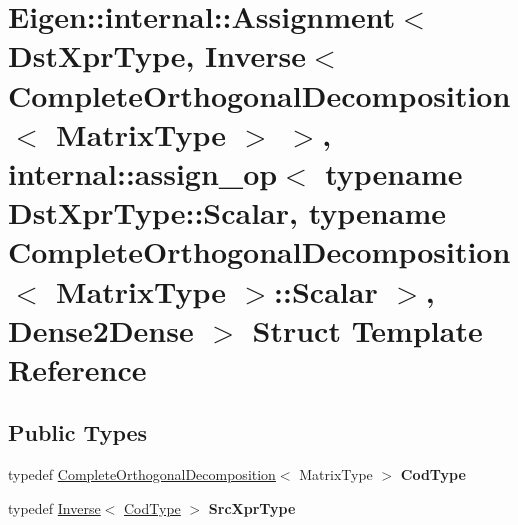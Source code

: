 \hypertarget{struct_eigen_1_1internal_1_1_assignment_3_01_dst_xpr_type_00_01_inverse_3_01_complete_orthogonalcd5d352c5ea4dcae855a0a56ba39cbfd}{}\section{Eigen\+::internal\+::Assignment$<$ Dst\+Xpr\+Type, Inverse$<$ Complete\+Orthogonal\+Decomposition$<$ Matrix\+Type $>$ $>$, internal\+::assign\+\_\+op$<$ typename Dst\+Xpr\+Type\+::Scalar, typename Complete\+Orthogonal\+Decomposition$<$ Matrix\+Type $>$\+::Scalar $>$, Dense2\+Dense $>$ Struct Template Reference}
\label{struct_eigen_1_1internal_1_1_assignment_3_01_dst_xpr_type_00_01_inverse_3_01_complete_orthogonalcd5d352c5ea4dcae855a0a56ba39cbfd}
\subsection*{Public Types}
\begin{DoxyCompactItemize}
\item 
\mbox{\label{struct_eigen_1_1internal_1_1_assignment_3_01_dst_xpr_type_00_01_inverse_3_01_complete_orthogonalcd5d352c5ea4dcae855a0a56ba39cbfd_a6e9ed2f22b3b6819673298563a40a6a0}} 
typedef \mbox{\hyperlink{class_eigen_1_1_complete_orthogonal_decomposition}{Complete\+Orthogonal\+Decomposition}}$<$ Matrix\+Type $>$ {\bfseries Cod\+Type}
\item 
\mbox{\label{struct_eigen_1_1internal_1_1_assignment_3_01_dst_xpr_type_00_01_inverse_3_01_complete_orthogonalcd5d352c5ea4dcae855a0a56ba39cbfd_a3b7796a3ddf3763ff8eaf5d32435a247}} 
typedef \mbox{\hyperlink{class_eigen_1_1_inverse}{Inverse}}$<$ \mbox{\hyperlink{class_eigen_1_1_complete_orthogonal_decomposition}{Cod\+Type}} $>$ {\bfseries Src\+Xpr\+Type}
\end{DoxyCompactItemize}
